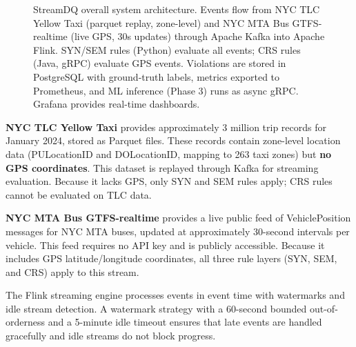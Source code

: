 \begin{figure}[htbp]
  \centering
  \caption{StreamDQ overall system architecture. Events flow from NYC TLC Yellow
    Taxi (parquet replay, zone-level) and NYC MTA Bus GTFS-realtime (live GPS,
    30s updates) through Apache Kafka into Apache Flink. SYN/SEM rules (Python)
    evaluate all events; CRS rules (Java, gRPC) evaluate GPS events. Violations
    are stored in PostgreSQL with ground-truth labels, metrics exported to
    Prometheus, and ML inference (Phase 3) runs as async gRPC. Grafana provides
    real-time dashboards.}
  \label{fig:system-architecture}
\end{figure}

\textbf{NYC TLC Yellow Taxi} \citep{nyc_tlc} provides approximately
3 million trip records for January 2024, stored as Parquet files.
These records contain zone-level location data (PULocationID and DOLocationID,
mapping to 263 taxi zones) but \textbf{no GPS coordinates}. This dataset
is replayed through Kafka for streaming evaluation. Because it lacks GPS,
only SYN and SEM rules apply; CRS rules cannot be evaluated on TLC data.

\textbf{NYC MTA Bus GTFS-realtime} \citep{nyc_mta_bus} provides a live
public feed of VehiclePosition messages for NYC MTA buses, updated at
approximately 30-second intervals per vehicle. This feed requires no API
key and is publicly accessible. Because it includes GPS latitude/longitude
coordinates, all three rule layers (SYN, SEM, and CRS) apply to this
stream.

The Flink streaming engine \citep{apache_flink} processes events in
event time with watermarks and idle stream detection. A watermark strategy
with a 60-second bounded out-of-orderness and a 5-minute idle timeout
ensures that late events are handled gracefully and idle streams do not
block progress.

